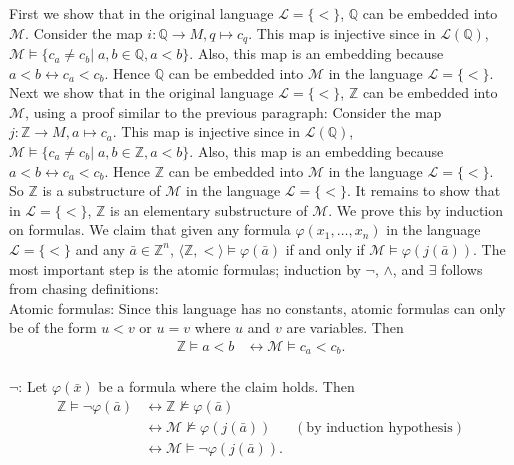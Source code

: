 \documentclass{article}
\begin{document}
\begin{enumerate}
    First we show that in the original language $\mathcal{L}=\{<\}$,
    $\mathbb{Q}$ can be embedded into $\mathcal{M}$. Consider the map
    $i:\mathbb{Q}\rightarrow M,q\mapsto c_q$. This map is injective since
    in $\mathcal{L}(\mathbb{Q})$, $\mathcal{M}\models \{c_a\neq c_b|\;
    a,b\in\mathbb{Q}, a<b\}$. Also, this map is an embedding because
    $a<b\leftrightarrow c_a<c_b$. Hence $\mathbb{Q}$ can be embedded into
    $\mathcal{M}$ in the language $\mathcal{L}=\{<\}$. \\

    Next we show that in the original language $\mathcal{L}=\{<\}$,
    $\mathbb{Z}$ can be embedded into $\mathcal{M}$, using a proof similar
    to the previous paragraph: Consider the map $j:\mathbb{Z}\rightarrow
    M,a\mapsto c_a$. This map is injective since in
    $\mathcal{L}(\mathbb{Q})$, $\mathcal{M}\models \{c_a\neq c_b|\;
    a,b\in\mathbb{Z}, a<b\}$. Also, this map is an embedding because
    $a<b\leftrightarrow c_a<c_b$. Hence $\mathbb{Z}$ can be embedded into
    $\mathcal{M}$ in the language $\mathcal{L}=\{<\}$. \\

    So $\mathbb{Z}$ is a substructure of $\mathcal{M}$ in the language
    $\mathcal{L}=\{<\}$. It remains to show that in $\mathcal{L}=\{<\}$,
    $\mathbb{Z}$ is an elementary substructure of $\mathcal{M}$. We prove
    this by induction on formulas. We claim that given any formula
    $\varphi(x_1,\ldots,x_n)$ in the language $\mathcal{L}=\{<\}$ and any
    $\bar{a}\in\mathbb{Z}^n$,
    $\langle\mathbb{Z},<\rangle\models\varphi(\bar{a})$ if and only if
    $\mathcal{M}\models\varphi(j(\bar{a}))$. The most important step is the
    atomic formulas; induction by $\neg$, $\wedge$, and $\exists$ follows
    from chasing definitions: \\

    Atomic formulas: Since this language has no constants, atomic formulas
    can only be of the form $u<v$ or $u=v$ where $u$ and $v$ are variables.
    Then
    \begin{align*}
      \mathbb{Z}\models a<b &\leftrightarrow\mathcal{M}\models c_a<c_b. \\
    \end{align*}

    $\neg$: Let $\varphi(\bar{x})$ be a formula where the claim holds.
    Then
    \begin{align*}
      \mathbb{Z}\models\neg\varphi(\bar{a})
        &\leftrightarrow\mathbb{Z}\not\models\varphi(\bar{a}) & \\
        &\leftrightarrow\mathcal{M}\not\models\varphi(j(\bar{a}))  & (\text{by
          induction hypothesis}) \\
        &\leftrightarrow\mathcal{M}\models\neg\varphi(j(\bar{a})). & \\
    \end{align*}


\end{enumerate}
\end{document}
